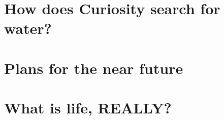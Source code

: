 \documentclass[DIV=calc, paper=a4, fontsize=12pt]{scrartcl}	 %
\begin{document}
\section*{How does Curiosity search for water?}
\begin{multicols}{2}














\end{multicols}

\section*{Plans for the near future}

\begin{multicols}{2}







\end{multicols}

\section*{What is life, REALLY?}

\begin{multicols}{2}





\end{multicols}

\onecolumn


\end{document}
